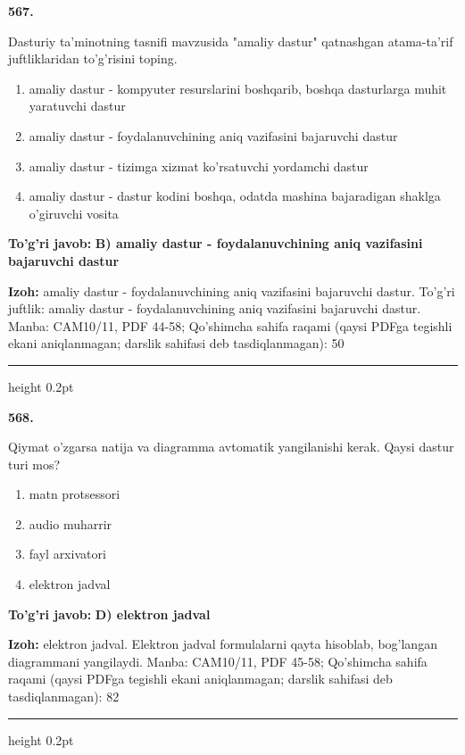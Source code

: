 \documentclass[10pt,a4paper]{article}
\begin{document}
{\bfseries\sffamily\color{ink} 567.}
\par
Dasturiy ta'minotning tasnifi mavzusida "amaliy dastur" qatnashgan atama-ta'rif juftliklaridan to'g'risini toping.
\begin{enumerate}[label=\Alph*),leftmargin=9mm]
\item amaliy dastur - kompyuter resurslarini boshqarib, boshqa dasturlarga muhit yaratuvchi dastur
\item amaliy dastur - foydalanuvchining aniq vazifasini bajaruvchi dastur
\item amaliy dastur - tizimga xizmat ko'rsatuvchi yordamchi dastur
\item amaliy dastur - dastur kodini boshqa, odatda mashina bajaradigan shaklga o'giruvchi vosita
\end{enumerate}
\begin{tcolorbox}[enhanced,breakable,colback=teal!4,colframe=teal!60!black,boxrule=0.45pt,arc=1.2mm,left=2.7mm,right=2.7mm,top=1.8mm,bottom=1.8mm,before skip=2mm,after skip=2mm]
{\bfseries\sffamily\color{teal}To'g'ri javob:} \textbf{B) amaliy dastur - foydalanuvchining aniq vazifasini bajaruvchi dastur}
\par\smallskip
{\bfseries Izoh:} amaliy dastur - foydalanuvchining aniq vazifasini bajaruvchi dastur. To'g'ri juftlik: amaliy dastur - foydalanuvchining aniq vazifasini bajaruvchi dastur. Manba: CAM10/11, PDF 44-58; Qo'shimcha sahifa raqami (qaysi PDFga tegishli ekani aniqlanmagan; darslik sahifasi deb tasdiqlanmagan): 50
\end{tcolorbox}
\vspace{2mm}\hrule height 0.2pt\vspace{3mm}

{\bfseries\sffamily\color{ink} 568.}
\par
Qiymat o'zgarsa natija va diagramma avtomatik yangilanishi kerak. Qaysi dastur turi mos?
\begin{enumerate}[label=\Alph*),leftmargin=9mm]
\item matn protsessori
\item audio muharrir
\item fayl arxivatori
\item elektron jadval
\end{enumerate}
\begin{tcolorbox}[enhanced,breakable,colback=teal!4,colframe=teal!60!black,boxrule=0.45pt,arc=1.2mm,left=2.7mm,right=2.7mm,top=1.8mm,bottom=1.8mm,before skip=2mm,after skip=2mm]
{\bfseries\sffamily\color{teal}To'g'ri javob:} \textbf{D) elektron jadval}
\par\smallskip
{\bfseries Izoh:} elektron jadval. Elektron jadval formulalarni qayta hisoblab, bog'langan diagrammani yangilaydi. Manba: CAM10/11, PDF 45-58; Qo'shimcha sahifa raqami (qaysi PDFga tegishli ekani aniqlanmagan; darslik sahifasi deb tasdiqlanmagan): 82
\end{tcolorbox}
\vspace{2mm}\hrule height 0.2pt\vspace{3mm}
\end{document}
